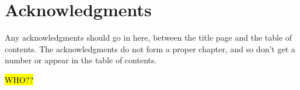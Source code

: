 \chapter*{Acknowledgments}\label{C:ack} 
Any acknowledgments should go 
in here, between the title page and the table of contents.  The 
acknowledgments do not form a proper chapter, and so don't get a 
number or appear in the table of contents.


\hl{WHO??}

